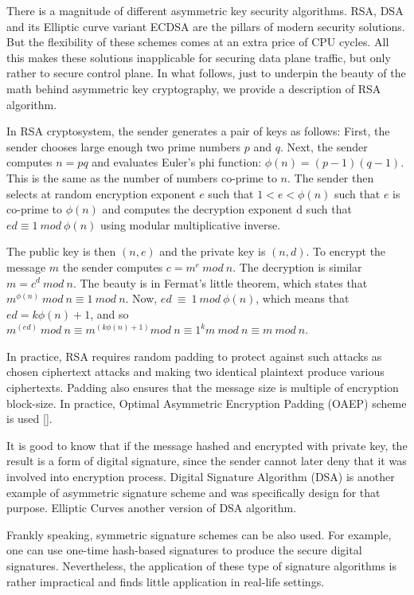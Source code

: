 There is a magnitude of different asymmetric key security algorithms. 
RSA, DSA and its Elliptic curve variant ECDSA are the pillars of modern 
security solutions. But the flexibility of these schemes comes at an extra 
price of CPU cycles. All this makes these solutions inapplicable for securing 
data plane traffic, but only rather to secure control plane. In what follows, 
just to underpin the beauty of the math behind asymmetric key cryptography, 
we provide a description of RSA algorithm.

In RSA cryptosystem, the sender generates a pair of keys as follows: 
First, the sender chooses large enough two prime numbers $p$ and $q$. Next, 
the sender computes $n=pq$ and evaluates Euler’s phi function: $\phi(n)=(p-1)(q-1)$. 
This is the same as the number of numbers co-prime to $n$. The sender then selects at 
random encryption exponent $e$ such that $1<e<\phi(n)$ such that $e$ is co-prime to $\phi(n)$ 
and computes the decryption exponent d such that $ed \equiv 1\ mod\ \phi(n)$ using modular 
multiplicative inverse.

The public key is then $(n, e)$ and the private key is $(n, d)$. To encrypt the message $m$ 
the sender computes $c= m^e\ mod\ n$. The decryption is similar $m = c^d\ mod\ n$. The beauty is 
in Fermat’s little theorem, which states that $m^{\phi(n)}\ mod\ n \equiv 1\ mod\ n$. 
Now, $ed\ \equiv\ 1\ mod\ \phi(n)$, which means that 
$ed=k\phi(n)+1$, and so $m^{(ed)}\ mod\ n \equiv m^{(k\phi(n)+1)} mod\ n \equiv 1^k m\ mod\ n \equiv m\ mod\ n$. 

In practice, RSA requires random padding to protect against such attacks as chosen ciphertext 
attacks and making two identical plaintext produce various ciphertexts. Padding also ensures that the 
message size is multiple of encryption block-size. In practice, Optimal Asymmetric Encryption Padding (OAEP) 
scheme is used [].

It is good to know that if the message hashed and encrypted with private key, the result is a 
form of digital signature, since the sender cannot later deny that it was involved into encryption 
process. Digital Signature Algorithm (DSA) is another example of asymmetric signature scheme and 
was specifically design for that purpose. Elliptic Curves another version of DSA algorithm.

Frankly speaking, symmetric signature schemes can be also used. For example, one can use 
one-time hash-based signatures to produce the secure digital signatures. Nevertheless, 
the application of these type of signature algorithms is rather impractical and finds 
little application in real-life settings.

